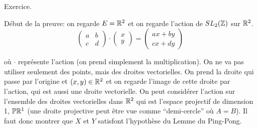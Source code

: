   \begin{preuve}
    Exercice.

    Début de la preuve: on regarde $E = \mathbb{R}^2$ et on regarde l'action de $SL_2(\mathbb{Z})$ sur $\mathbb{R}^2$. 
      \[
      \begin{pmatrix}
        a & b \\ c & d
      \end{pmatrix}
      \cdot
      \begin{pmatrix}
        x \\ y
      \end{pmatrix} = 
      \begin{pmatrix}
        ax + by\\ cx + dy
      \end{pmatrix}
      \]

      \begin{center}
      \end{center}

      où $\cdot$ représente l'action (on prend simplement la multiplication). On ne va pas utiliser seulement
      des points, mais des droites vectorielles. On prend la droite qui passe par l'origine et $(x,y) \in
      \mathbb{R}^2$ et on regarde l'image de cette droite par l'action, qui est aussi une droite vectorielle. On peut
      considérer l'action sur l'ensemble des droites vectorielles dans $\mathbb{R}^2$ qui est l'espace projectif de
      dimension 1, $\mathbb{P}\mathbb{R}^1$ (une droite projective peut être vue comme ``demi-cercle'' où $A = B$).
      Il faut donc montrer que $X$ et $Y$ satisfont l'hypothèse du Lemme du Ping-Pong. 

      \begin{center}
      \end{center}

  \end{preuve}

